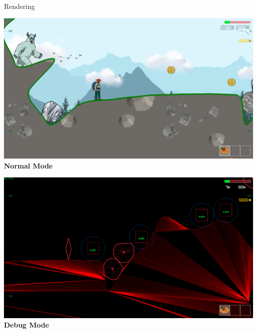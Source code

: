 \begin{frame}{Rendering}
    \begin{center}
        \begin{minipage}{0.49\textwidth}
            \includegraphics[width=\textwidth]{../figures/Ingame-Picture.png}
            \textbf{Normal Mode}
        \end{minipage}
        \pause
        \begin{minipage}{0.49\textwidth}
            \includegraphics[width=\textwidth]{../figures/Debug-Mode.png}
            \textbf{Debug Mode}
        \end{minipage}
    \end{center}
\end{frame}

